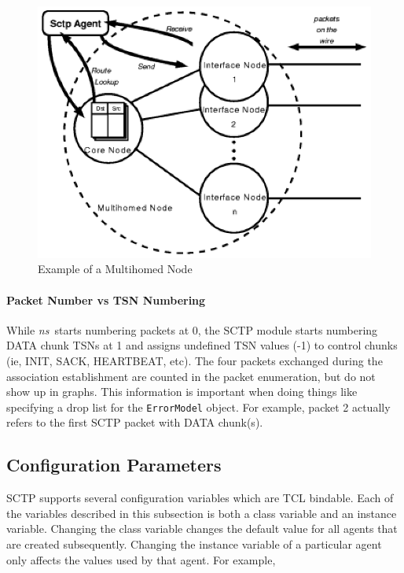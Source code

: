       \begin{figure}[tb] 
	\centerline{\includegraphics{sctp-multihomedNode}}
	\caption{Example of a Multihomed Node}
	\label{fig:multihomedNode} 
      \end{figure}

      \paragraph{Packet Number vs TSN Numbering} While \emph{ns}~starts numbering
      packets at 0, the SCTP module starts numbering DATA chunk TSNs at 1
      and assigns undefined TSN values (-1) to control chunks (ie, INIT,
      SACK, HEARTBEAT, etc). The four packets exchanged during the
      association establishment are counted in the packet enumeration, but
      do not show up in graphs. This information is important when doing
      things like specifying a drop list for the {\tt ErrorModel}
      object. For example, packet 2 actually refers to the first SCTP
      packet with DATA chunk(s).


      \subsection{Configuration Parameters}
      \label{sec:sctpConfig}

	 SCTP supports several configuration variables which are TCL
	 bindable. Each of the variables described in this subsection is
	 both a class variable and an instance variable.  Changing the
	 class variable changes the default value for all agents that are
	 created subsequently.  Changing the instance variable of a
	 particular agent only affects the values used by that agent.  For
	 example,

